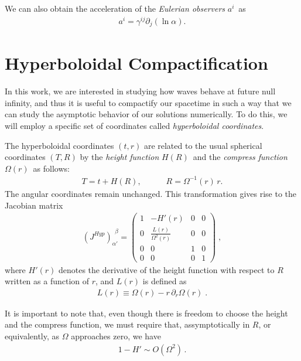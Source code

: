 We can also obtain the acceleration of the \textit{Eulerian observers} $a^i$~as
\begin{align}
    a^i = \gamma^{ij} \partial_j(\ln \alpha).
\end{align}


\section{Hyperboloidal Compactification}
\label{section:compactification}

In this work, we are interested in studying how waves behave at future null infinity, and thus it is useful to compactify our spacetime in such a way that we can study the asymptotic behavior of our solutions numerically. To do this, we will employ a specific set of coordinates called \textit{hyperboloidal coordinates}. 

The hyperboloidal coordinates $(t, r)$ are related to the usual spherical coordinates $(T, R)$ by the \textit{height function} $H(R)$~and the \textit{compress function} $\Omega(r)$~as follows:
%
\begin{align}
    T = t + H(R), \quad \quad \quad R = \Omega^{-1}(r) \, r.
\end{align}
%
The angular coordinates remain unchanged. This transformation gives rise to the Jacobian matrix
%
\begin{align}
    \left(J^{Hyp}\right)_{\alpha'}^{\ \ \beta} = 
    \begin{pmatrix}
        1 & -H'(r) & 0 & 0 \\
        0 & \frac{L(r)}{\Omega^2(r)} & 0 & 0 \\
        0 & 0 & 1 & 0 \\
        0 & 0 & 0 & 1
    \end{pmatrix} \; ,
\end{align}
%
where $H'(r)$ denotes the derivative of the height function with respect to $R$ written as a function of $r$, and $L(r)$ is defined as
%
\begin{align}
    L(r) \equiv \Omega(r) - r \, \partial_r \Omega(r) \; .
\end{align}

It is important to note that, even though there is freedom to choose the height and the compress function, we must require that, assymptotically in $R$, or equivalently, as $\Omega$ approaches zero, we have
%
\begin{align}
    1 - H' \sim O(\Omega^2) \, .
\end{align}


